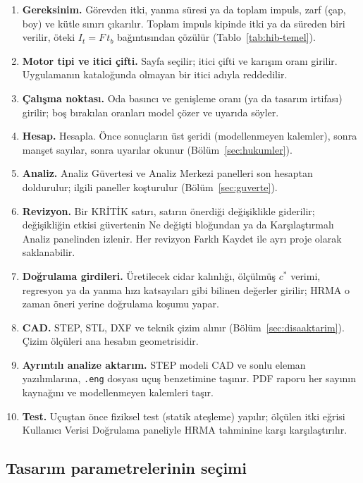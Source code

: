\documentclass[11pt,a4paper]{article}
\newcommand{\ui}[1]{\textsf{#1}}
\newcommand{\kod}[1]{\texttt{#1}}
\begin{document}
\begin{enumerate}[leftmargin=1.6em]
  \item \textbf{Gereksinim.} Görevden itki, yanma süresi ya da toplam
  impuls, zarf (çap, boy) ve kütle sınırı çıkarılır. Toplam impuls kipinde
  itki ya da süreden biri verilir, öteki $I_t = F\,t_b$ bağıntısından çözülür
  (Tablo~\ref{tab:hib-temel}).
  \item \textbf{Motor tipi ve itici çifti.} Sayfa seçilir; itici çifti ve
  karışım oranı girilir. Uygulamanın kataloğunda olmayan bir itici adıyla
  reddedilir.
  \item \textbf{Çalışma noktası.} Oda basıncı ve genişleme oranı (ya da
  tasarım irtifası) girilir; boş bırakılan oranları model çözer ve uyarıda
  söyler.
  \item \textbf{Hesap.} \ui{Hesapla}. Önce sonuçların üst şeridi
  (modellenmeyen kalemler), sonra manşet sayılar, sonra uyarılar okunur
  (Bölüm~\ref{sec:hukumler}).
  \item \textbf{Analiz.} Analiz Güvertesi ve Analiz Merkezi panelleri son
  hesaptan doldurulur; ilgili paneller koşturulur (Bölüm~\ref{sec:guverte}).
  \item \textbf{Revizyon.} Bir \ui{KRİTİK} satırı, satırın önerdiği
  değişiklikle giderilir; değişikliğin etkisi güvertenin \ui{Ne değişti}
  bloğundan ya da \ui{Karşılaştırmalı Analiz} panelinden izlenir. Her
  revizyon \ui{Farklı Kaydet} ile ayrı proje olarak saklanabilir.
  \item \textbf{Doğrulama girdileri.} Üretilecek cidar kalınlığı, ölçülmüş
  $c^*$ verimi, regresyon ya da yanma hızı katsayıları gibi bilinen değerler
  girilir; HRMA o zaman öneri yerine doğrulama koşumu yapar.
  \item \textbf{CAD.} STEP, STL, DXF ve teknik çizim alınır
  (Bölüm~\ref{sec:disaaktarim}). Çizim ölçüleri ana hesabın geometrisidir.
  \item \textbf{Ayrıntılı analize aktarım.} STEP modeli CAD ve sonlu eleman
  yazılımlarına, \kod{.eng} dosyası uçuş benzetimine taşınır. PDF raporu
  her sayının kaynağını ve modellenmeyen kalemleri taşır.
  \item \textbf{Test.} Uçuştan önce fiziksel test (statik ateşleme) yapılır;
  ölçülen itki eğrisi \ui{Kullanıcı Verisi Doğrulama} paneliyle HRMA
  tahminine karşı karşılaştırılır.
\end{enumerate}

\subsection{Tasarım parametrelerinin seçimi}\label{sec:yontem}
\end{document}
